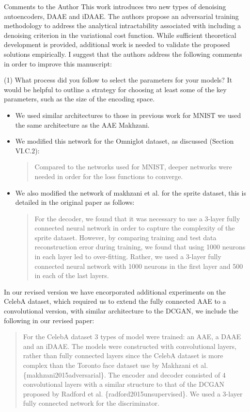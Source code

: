 \documentclass{article}
\begin{document}
Comments to the Author
{\color{blue}
This work introduces two new types of denoising autoencoders, DAAE and iDAAE. The authors propose an adversarial training methodology to address the analytical intractability associated with including a denoising criterion in the variational cost function. While sufficient theoretical development is provided, additional work is needed to validate the proposed solutions empirically. I suggest that the authors address the following comments in order to improve this manuscript:}\newline

{\color{blue}
(1) What process did you follow to select the parameters for your models? It would be helpful to outline a strategy for choosing at least some of the key parameters, such as the size of the encoding space. }\newline
\begin{itemize}
    \item We used similar architectures to those in previous work for MNIST we used the same architecture as the AAE {Makhzani}.
    \item We modified this network for the Omniglot dataset, as discussed (Section VI.C.2):
    \begin{quote}
        Compared  to  the  networks  used  for  MNIST,  deeper networks  were  needed  in  order  for  the  loss  functions  to converge.
    \end{quote}
    \item We also modified the network of makhzani et al. for the sprite dataset, this is detailed in the original paper as follows:
    \begin{quote}
        For  the  decoder,  we  found  that  it  was  necessary  to  use  a 3-layer  fully  connected  neural  network  in  order  to  capture the  complexity  of  the  sprite  dataset.  However,  by  comparing training and test data reconstruction error during training, we found that using 1000 neurons in each layer led to over-fitting. Rather, we used a 3-layer fully connected neural network with 1000 neurons  in  the  first  layer  and 500 in  each  of  the  last layers.
    \end{quote}
    
\end{itemize}

{\color{red}
In our revised version we have encorporated additional experiments on the CelebA dataset, which required us to extend the fully connected AAE to a convolutional version, with similar architecture to the DCGAN, we include the following in our revised paper:

\begin{quote}
For the CelebA dataset $3$ types of model were trained: an AAE, a DAAE and an iDAAE. The models were constructed with convolutional layers, rather than fully connected layers since the CelebA dataset is more complex than the Toronto face dataset use by Makhzani et al. \{makhzani2015adversarial\}. The encoder and decoder consisted of $4$ convolutional layers with a similar structure to that of the DCGAN proposed by Radford et al. \{radford2015unsupervised\}. We used a $3$-layer fully connected network for the discriminator. 
\end{quote}
}
\end{document}
